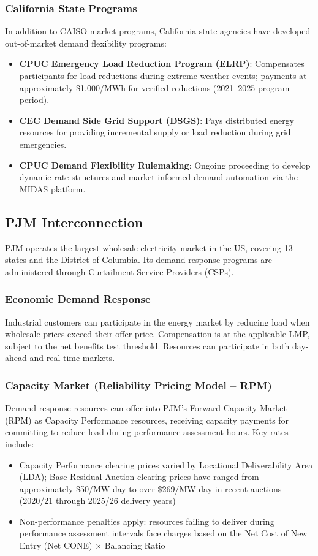 \documentclass[12pt]{article}
\begin{document}
\subsubsection{California State Programs}
In addition to CAISO market programs, California state agencies have developed out-of-market demand flexibility programs:
\begin{itemize}
    \item \textbf{CPUC Emergency Load Reduction Program (ELRP)}: Compensates participants for load reductions during extreme weather events; payments at approximately \$1,000/MWh for verified reductions (2021--2025 program period).
    \item \textbf{CEC Demand Side Grid Support (DSGS)}: Pays distributed energy resources for providing incremental supply or load reduction during grid emergencies.
    \item \textbf{CPUC Demand Flexibility Rulemaking}: Ongoing proceeding to develop dynamic rate structures and market-informed demand automation via the MIDAS platform.
\end{itemize}

\subsection{PJM Interconnection}

PJM operates the largest wholesale electricity market in the US, covering 13 states and the District of Columbia. Its demand response programs are administered through Curtailment Service Providers (CSPs).

\subsubsection{Economic Demand Response}
Industrial customers can participate in the energy market by reducing load when wholesale prices exceed their offer price. Compensation is at the applicable LMP, subject to the net benefits test threshold. Resources can participate in both day-ahead and real-time markets.

\subsubsection{Capacity Market (Reliability Pricing Model -- RPM)}
Demand response resources can offer into PJM's Forward Capacity Market (RPM) as Capacity Performance resources, receiving capacity payments for committing to reduce load during performance assessment hours. Key rates include:
\begin{itemize}
    \item Capacity Performance clearing prices varied by Locational Deliverability Area (LDA); Base Residual Auction clearing prices have ranged from approximately \$50/MW-day to over \$269/MW-day in recent auctions (2020/21 through 2025/26 delivery years)
    \item Non-performance penalties apply: resources failing to deliver during performance assessment intervals face charges based on the Net Cost of New Entry (Net CONE) $\times$ Balancing Ratio
\end{itemize}
\end{document}
